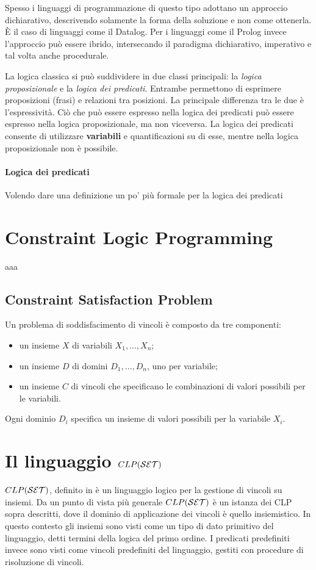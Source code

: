 Spesso i linguaggi di programmazione di questo tipo adottano un approccio dichiarativo, descrivendo solamente la forma della soluzione e non come ottenerla. \`E il caso di linguaggi come il Datalog. Per i linguaggi come il Prolog invece l'approccio può essere ibrido, intersecando il paradigma dichiarativo, imperativo e tal volta anche procedurale.

La logica classica si può suddividere in due classi principali: la \emph{logica proposizionale} e la \emph{logica dei predicati}. Entrambe permettono di esprimere proposizioni (frasi) e relazioni tra posizioni. La principale differenza tra le due è l'espressività. Ciò che può essere espresso nella logica dei predicati può essere espresso nella logica proposizionale, ma non viceversa. La logica dei predicati consente di utilizzare \textbf{variabili} e quantificazioni su di esse, mentre nella logica proposizionale non è possibile.

\paragraph{Logica dei predicati}
Volendo dare una definizione un po' più formale per la logica dei predicati 

\section{Constraint Logic Programming}
\label{sec:clp}
aaa

\subsection{Constraint Satisfaction Problem}
\label{sec:csp}
Un problema di soddisfacimento di vincoli è composto da tre componenti:
\begin{itemize}
\item un insieme $X$ di variabili ${X_1, \ldots, X_n}$;
\item un insieme $D$ di domini ${D_1, \ldots, D_n}$, uno per variabile;
\item un insieme $C$ di vincoli che specificano le combinazioni di valori possibili per le variabili.
\end{itemize}

Ogni dominio $D_i$ specifica un insieme di valori possibili per la variabile $X_i$.



\section{Il linguaggio $CLP(\mathcal{S}\mathcal{E}\mathcal{T})$}
\label{sec:clpset}
$CLP(\mathcal{S}\mathcal{E}\mathcal{T})$, definito in \cite{2000-CLP(SET)} è un linguaggio logico per la gestione di vincoli su insiemi. Da un punto di vista più generale $CLP(\mathcal{S}\mathcal{E}\mathcal{T})$ è un istanza dei CLP sopra descritti, dove il dominio di applicazione dei vincoli è quello insiemistico. In questo contesto gli insiemi sono visti come un tipo di dato primitivo del linguaggio, detti termini della logica del primo ordine. I predicati predefiniti invece sono visti come vincoli predefiniti del linguaggio, gestiti con procedure di risoluzione di vincoli. 

